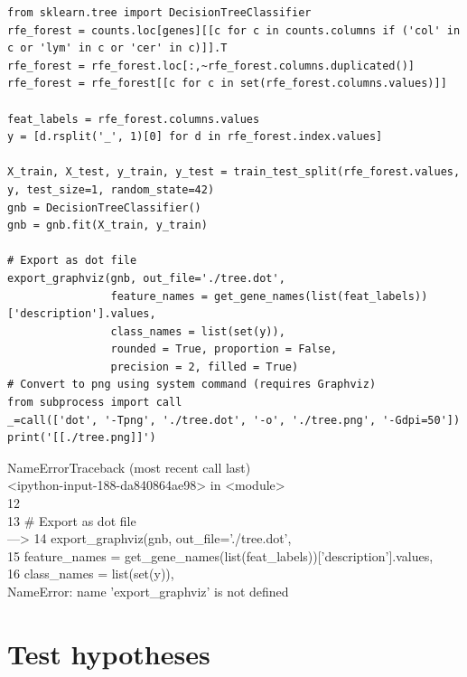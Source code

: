 \documentclass[11pt]{article}
\begin{document}
\begin{verbatim}
from sklearn.tree import DecisionTreeClassifier
rfe_forest = counts.loc[genes][[c for c in counts.columns if ('col' in c or 'lym' in c or 'cer' in c)]].T
rfe_forest = rfe_forest.loc[:,~rfe_forest.columns.duplicated()]
rfe_forest = rfe_forest[[c for c in set(rfe_forest.columns.values)]]

feat_labels = rfe_forest.columns.values
y = [d.rsplit('_', 1)[0] for d in rfe_forest.index.values]

X_train, X_test, y_train, y_test = train_test_split(rfe_forest.values, y, test_size=1, random_state=42)
gnb = DecisionTreeClassifier()
gnb = gnb.fit(X_train, y_train)

# Export as dot file
export_graphviz(gnb, out_file='./tree.dot',
                feature_names = get_gene_names(list(feat_labels))['description'].values,
                class_names = list(set(y)),
                rounded = True, proportion = False,
                precision = 2, filled = True)
# Convert to png using system command (requires Graphviz)
from subprocess import call
_=call(['dot', '-Tpng', './tree.dot', '-o', './tree.png', '-Gdpi=50'])
print('[[./tree.png]]')

\end{verbatim}

NameErrorTraceback (most recent call last)\\
<ipython-input-188-da840864ae98> in <module>\\
     12\\
     13 \# Export as dot file\\
---> 14 export\_graphviz(gnb, out\_file='./tree.dot',\\
     15                 feature\_names = get\_gene\_names(list(feat\_labels))['description'].values,\\
     16                 class\_names = list(set(y)),\\

NameError: name 'export\_graphviz' is not defined\\
\section{Test hypotheses}
\label{sec:org56e16dd}
\end{document}

